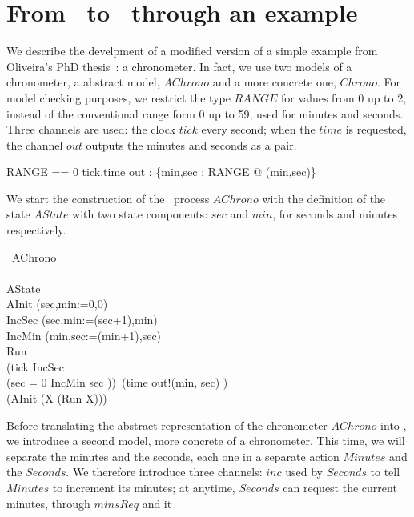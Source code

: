 \section{From \Circus\ to \CSPM\ through an example}
We describe the develpment of a modified version of a simple example from 
Oliveira's PhD thesis~\cite{MV05}: a chronometer. In fact, we use two models 
of a chronometer, a abstract model, $AChrono$ and a more concrete one, 
$Chrono$. For model checking purposes, we restrict the type $RANGE$ for values 
from 0 up to 2, instead of the conventional range form 0 up to 59, used for 
minutes and seconds. Three channels are used: the clock $tick$ every second; 
when the $time$ is requested, the channel $out$ outputs the minutes and 
seconds as a pair.
\begin{circus}
RANGE == 0 
\also \circchannel tick,time
\also \circchannel out : \{min,sec : RANGE @ (min,sec)\}
\end{circus}
We start the construction of the \Circus\ process $AChrono$ with the 
definition of the state $AState$ with two state components: $sec$ and $min$, 
for seconds and minutes respectively.
\begin{circus}
\circprocess\ AChrono \circdef\\
\circbegin\\ 
\circstate AState \\
AInit \circdef (sec,min:=0,0)\\
IncSec \circdef (sec,min:=(sec+1),min)\\
IncMin \circdef (min,sec:=(min+1),sec)\\
Run \circdef \\

   (tick \then IncSec \circseq \\
    (\circif  sec = 0 \circthen IncMin
        \circelse sec  \circthen \Skip \circfi ))\ 
    \extchoice (time \then out!(min, sec) \then \Skip) \\
\circspot (AInit \circseq (\circmu X \circspot (Run \circseq X)))\\
\circend
\end{circus}
Before translating the abstract representation of the chronometer $AChrono$ 
into \CSPM, we introduce a second model, more concrete of a chronometer. This 
time, we will separate the minutes and the seconds, each one in a separate 
action $Minutes$ and the $Seconds$. We therefore introduce three channels: 
$inc$ used by $Seconds$ to tell $Minutes$ to increment its minutes; at 
anytime, $Seconds$ can request the current minutes, through $minsReq$ and it 
